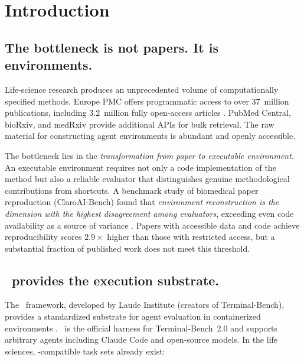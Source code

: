 \section{Introduction}
\label{sec:intro}

\subsection{The bottleneck is not papers. It is environments.}

Life-science research produces an unprecedented volume of computationally
specified methods. Europe PMC offers programmatic access to over 37~million
publications, including 3.2~million fully open-access articles
\cite{europepmc}. PubMed Central, bioRxiv, and medRxiv provide additional APIs
for bulk retrieval. The raw material for constructing agent environments is
abundant and openly accessible.

The bottleneck lies in the \emph{transformation from paper to executable
environment}. An executable environment requires not only a code implementation
of the method but also a reliable evaluator that distinguishes genuine
methodological contributions from shortcuts. A benchmark study of biomedical
paper reproduction (ClaroAI-Bench) found that \emph{environment reconstruction
is the dimension with the highest disagreement among evaluators}, exceeding
even code availability as a source of variance \cite{claroaibench}. Papers with
accessible data and code achieve reproducibility scores $2.9\times$ higher than
those with restricted access, but a substantial fraction of published work does
not meet this threshold.

\subsection{\harbor\ provides the execution substrate.}

The \harbor\ framework, developed by Laude Institute (creators of
Terminal-Bench), provides a standardized substrate for agent evaluation in
containerized environments \cite{harbor}. \harbor\ is the official harness for
Terminal-Bench~2.0 \cite{terminalbench} and supports arbitrary agents including
Claude Code and open-source models. In the life sciences, \harbor-compatible
task sets already exist:

